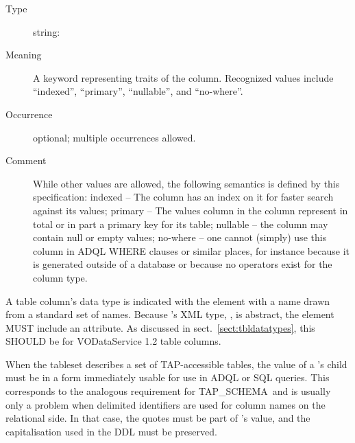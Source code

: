 \documentclass[11pt,a4paper]{ivoa}
\newcommand{\tapschema}{TAP\_SCHE\-MA}
\newcommand{\tapschema}{\mbox{%
  TAP\discretionary{-}{}{\kern-2pt\_}SCHEMA}}
\begin{document}
\begin{generated}
\begin{bigdescription}
\begin{description}
\end{description}
\item[Element \xmlel{flag}]
\begin{description}
\item[Type] string: 
\item[Meaning] A keyword representing traits of the column.
                        Recognized values include “indexed”, “primary”,
                        “nullable”, and “no-where”.
\item[Occurrence] optional; multiple occurrences allowed.
\item[Comment] While other values are allowed, the following semantics
                     	is defined by this specification: indexed – The column
                     	has an index on it for faster search against its values;
                     	primary – The values column in the column represent in
                     	total or in part a primary key for its table; nullable –
                     	the column may contain null or empty values;
                     	no-where – one cannot (simply) use this column in
                     	ADQL WHERE clauses or similar places, for instance
                     	because it is generated outside of a database or
                     	because no operators exist for the column type.

\end{description}


\end{bigdescription}\endgroup

\endgroup
\end{generated}



A table column's data type is indicated with the 
element with a name drawn from a standard set of names.
Because 's
XML type, , is abstract, the
element MUST include an
 attribute.  As discussed in
sect.~\ref{sect:tbldatatypes}, this SHOULD be
 for VODataService 1.2 table columns.

When the tableset describes a set of TAP-accessible tables, the value of
a 's  child must be in a form immediately
usable for use in ADQL or SQL queries. This corresponds to the analogous
requirement for \tapschema\ and is usually only a problem when delimited
identifiers are used for column names on the relational side.  In that
case, the quotes must be part of 's value, and the
capitalisation used in the DDL must be preserved.
\end{document}
